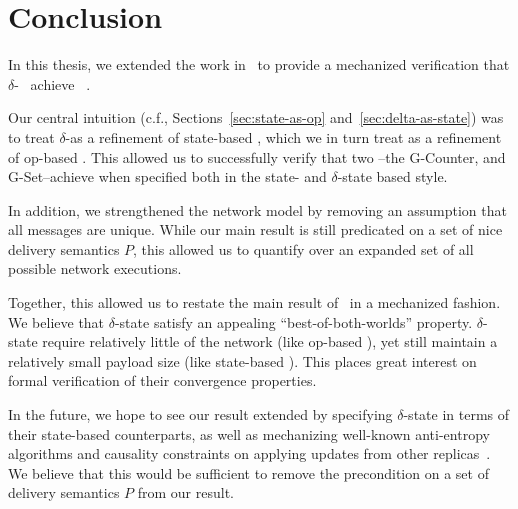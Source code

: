 \chapter{Conclusion}
\label{chap:conclusion}

In this thesis, we extended the work in~\citep{gomes17} to provide a mechanized
verification that $\delta$-\CRDTs~\citep{almedia18} achieve
\SEC~\citep{shapiro11}.

Our central intuition (c.f., Sections~\ref{sec:state-as-op}
and~\ref{sec:delta-as-state}) was to treat $\delta$-\CRDTs as a refinement of
state-based \CRDTs, which we in turn treat as a refinement of op-based \CRDTs.
This allowed us to successfully verify that two \CRDTs--the G-Counter, and
G-Set--achieve \SEC when specified both in the state- and $\delta$-state based
style.

In addition, we strengthened the network model by removing an assumption that
all messages are unique. While our main result is still predicated on a set of
nice delivery semantics $P$, this allowed us to quantify over an expanded set of
all possible network executions.

Together, this allowed us to restate the main result of~\citep{almedia18} in a
mechanized fashion. We believe that $\delta$-state \CRDTs satisfy an appealing
``best-of-both-worlds'' property. $\delta$-state \CRDTs require relatively
little of the network (like op-based \CRDTs), yet still maintain a relatively
small payload size (like state-based \CRDTs). This places great interest on
formal verification of their convergence properties.

In the future, we hope to see our result extended by specifying $\delta$-state
\CRDTs in terms of their state-based counterparts, as well as mechanizing
well-known anti-entropy algorithms and causality constraints on applying updates
from other replicas~\citep{almedia18}. We believe that this would be sufficient
to remove the precondition on a set of delivery semantics $P$ from our result.
